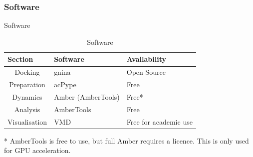 \subsubsection{Software}
\begin{frame}{Software}
    \begin{table}[H]
    \centering
    \begin{tabular}{@{}cll@{}}
    \toprule
    \multicolumn{1}{l}{\textbf{Section}} & \textbf{Software}  & \textbf{Availability}   \\ \midrule
    Docking         & gnina            		& Open Source	        \\
    Preparation		& acPype				& Free					\\
    Dynamics        & Amber (AmberTools)    & Free*                 \\
    Analysis		& AmberTools			& Free					\\
    Visualisation   & VMD     				& Free for academic use \\
    \bottomrule
    \end{tabular}
    \label{Tab:software}
    \caption{Software}
    \end{table}
* AmberTools is free to use, but full Amber requires a licence. This is only used for GPU acceleration.
\end{frame}